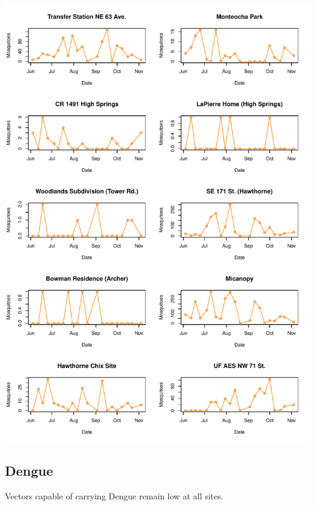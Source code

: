 \documentclass{article}
\begin{document}
\begin{center}
\includegraphics{mosq04nov13-012}
\newpage
\subsection*{Dengue}

\end{center}

Vectors capable of carrying Dengue remain low at all sites.\\
\end{document}
